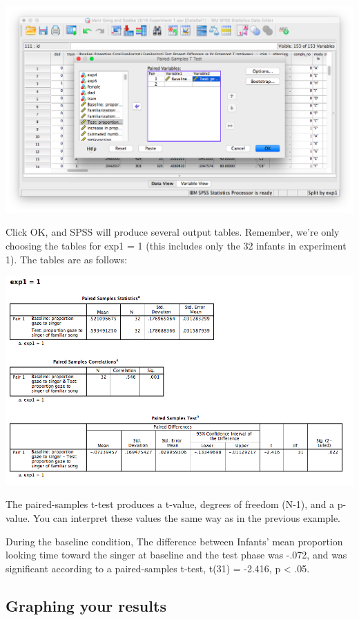 \documentclass[
]{book}
\begin{document}
\includegraphics{img/6.4.18.png}

Click {OK}, and SPSS will produce several output tables. Remember, we're only choosing the tables for exp1 = 1 (this includes only the 32 infants in experiment 1). The tables are as follows:

\includegraphics{img/6.4.19.png}

The paired-samples t-test produces a t-value, degrees of freedom (N-1), and a p-value. You can interpret these values the same way as in the previous example.

During the baseline condition, The difference between Infants' mean proportion looking time toward the singer at baseline and the test phase was -.072, and was significant according to a paired-samples t-test, t(31) = -2.416, p \textless{} .05.

\hypertarget{graphing-your-results}{%
\subsection{Graphing your results}\label{graphing-your-results}}
\end{document}
